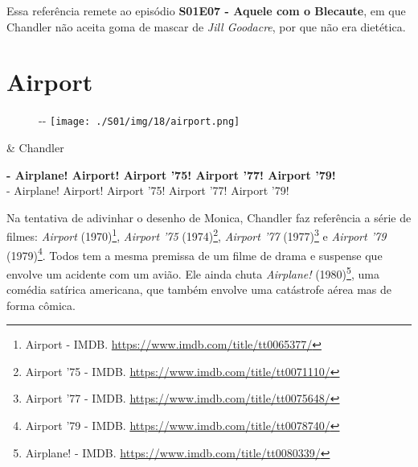 Essa referência remete ao episódio
\textbf{\textcolor{primarycolor}{S01E07 - Aquele com o Blecaute}}, em
que Chandler não aceita goma de mascar de \emph{Jill Goodacre}, por que
não era dietética.

\hypertarget{airport}{%
\section{Airport}\label{airport}}

\begin{figure}[!ht]
  \begin{adjustwidth}{-\oddsidemargin-1in}{-\rightmargin}
    \centering
    \texttt{[image: ./S01/img/18/airport.png]}
  \end{adjustwidth}
\end{figure}

\begin{tcolorbox}[enhanced,center upper,
    drop fuzzy shadow southeast, boxrule=0.3pt,
    lower separated=false, breakable,
    colframe=black!30!dialogoBorder,colback=white]
\begin{minipage}[c]{0.16\linewidth}
   & \centering \scriptsize{Chandler}
\end{minipage}
\hfill
\begin{minipage}[c]{0.8\linewidth}
  \textbf{- Airplane! Airport! Airport '75! Airport '77! Airport '79!}\\
  - Airplane! Airport! Airport '75! Airport '77! Airport '79!
\end{minipage}
\end{tcolorbox}

Na tentativa de adivinhar o desenho de Monica, Chandler faz referência a
série de filmes: \emph{Airport} (1970)\footnote{\sloppy Airport - IMDB. \url{https://www.imdb.com/title/tt0065377/}},
\emph{Airport '75} (1974)\footnote{\sloppy Airport ’75 - IMDB. \url{https://www.imdb.com/title/tt0071110/}},
\emph{Airport '77} (1977)\footnote{\sloppy Airport ’77 - IMDB. \url{https://www.imdb.com/title/tt0075648/}}
e \emph{Airport '79} (1979)\footnote{\sloppy Airport ’79 - IMDB. \url{https://www.imdb.com/title/tt0078740/}}.
Todos tem a mesma premissa de um filme de drama e suspense que envolve
um acidente com um avião. Ele ainda chuta \emph{Airplane!}
(1980)\footnote{\sloppy Airplane! - IMDB. \url{https://www.imdb.com/title/tt0080339/}},
uma comédia satírica americana, que também envolve uma catástrofe aérea
mas de forma cômica.

